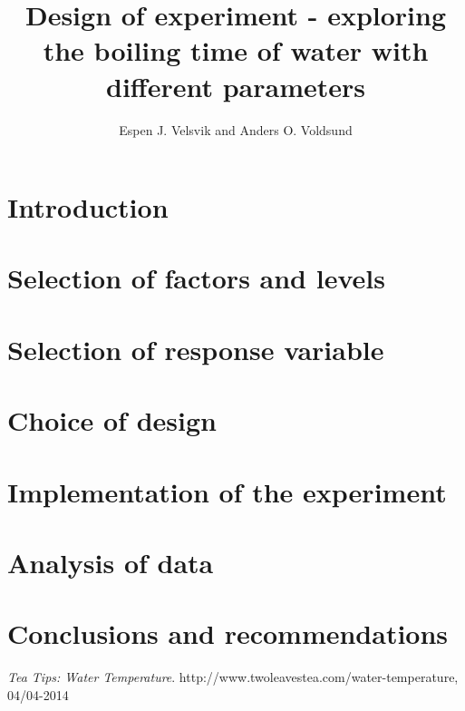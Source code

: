 \documentclass[10pt,a4paper]{article}
\begin{document}
\title{Design of experiment - exploring the boiling time of water with different parameters}
\author{Espen J. Velsvik and Anders O. Voldsund}
\maketitle

\section{Introduction}


\section{Selection of factors and levels}


\section{Selection of response variable}


\section{Choice of design}


\section{Implementation of the experiment}


\section{Analysis of data}


\section{Conclusions and recommendations}


\newpage

\begin{thebibliography}{9}
  \emph{Tea Tips: Water Temperature}.
  http://www.twoleavestea.com/water-temperature, 04/04-2014
\end{thebibliography}
\end{document}
